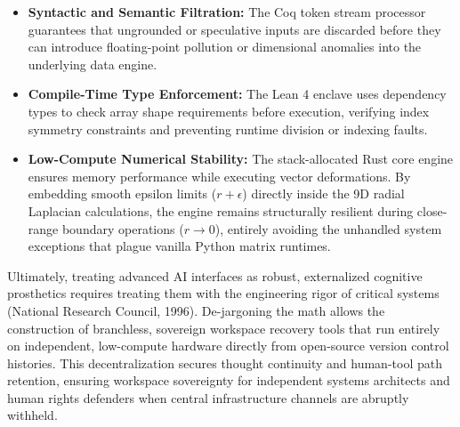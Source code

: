 \begin{itemize}
    \item \textbf{Syntactic and Semantic Filtration:} The Coq token stream processor guarantees that ungrounded or speculative inputs are discarded before they can introduce floating-point pollution or dimensional anomalies into the underlying data engine.
    \item \textbf{Compile-Time Type Enforcement:} The Lean 4 enclave uses dependency types to check array shape requirements before execution, verifying index symmetry constraints and preventing runtime division or indexing faults.
    \item \textbf{Low-Compute Numerical Stability:} The stack-allocated Rust core engine ensures memory performance while executing vector deformations. By embedding smooth epsilon limits ($r + \epsilon$) directly inside the 9D radial Laplacian calculations, the engine remains structurally resilient during close-range boundary operations ($r \to 0$), entirely avoiding the unhandled system exceptions that plague vanilla Python matrix runtimes.
\end{itemize}

Ultimately, treating advanced AI interfaces as robust, externalized cognitive prosthetics requires treating them with the engineering rigor of critical systems (National Research Council, 1996). De-jargoning the math allows the construction of branchless, sovereign workspace recovery tools that run entirely on independent, low-compute hardware directly from open-source version control histories. This decentralization secures thought continuity and human-tool path retention, ensuring workspace sovereignty for independent systems architects and human rights defenders when central infrastructure channels are abruptly withheld.



